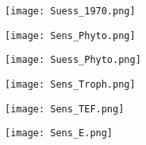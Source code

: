 \documentclass[12pt, titlepage]{article}
\begin{document}
\begin{figure}[H]
\texttt{[image: Suess\_1970.png]}
\end{figure}

\begin{figure}[H]
\texttt{[image: Sens\_Phyto.png]}
\end{figure}

\begin{figure}[H]
\texttt{[image: Suess\_Phyto.png]}
\end{figure}

\begin{figure}[H]
\texttt{[image: Sens\_Troph.png]}
\end{figure}

\begin{figure}[H]
\texttt{[image: Sens\_TEF.png]}
\end{figure}

\begin{figure}[H]
\texttt{[image: Sens\_E.png]}
\end{figure}
\end{document}
